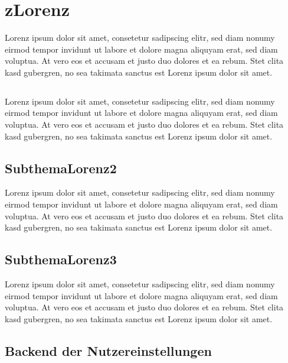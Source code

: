 \section{zLorenz}\label{subsec:zLorenz}

Lorenz ipsum dolor sit amet, consetetur sadipscing elitr, sed diam nonumy eirmod tempor invidunt ut labore et dolore magna aliquyam erat, sed diam voluptua.
At vero eos et accusam et justo duo dolores et ea rebum.
Stet clita kasd gubergren, no sea takimata sanctus est Lorenz ipsum dolor sit amet.

\subsection{}\label{subsubsec:lorenz1}

Lorenz ipsum dolor sit amet, consetetur sadipscing elitr, sed diam nonumy eirmod tempor invidunt ut labore et dolore magna aliquyam erat, sed diam voluptua.
At vero eos et accusam et justo duo dolores et ea rebum.
Stet clita kasd gubergren, no sea takimata sanctus est Lorenz ipsum dolor sit amet.

\subsection{SubthemaLorenz2}\label{subsubsec:lorenz2}

Lorenz ipsum dolor sit amet, consetetur sadipscing elitr, sed diam nonumy eirmod tempor invidunt ut labore et dolore magna aliquyam erat, sed diam voluptua.
At vero eos et accusam et justo duo dolores et ea rebum.
Stet clita kasd gubergren, no sea takimata sanctus est Lorenz ipsum dolor sit amet.

\subsection{SubthemaLorenz3}\label{subsubsec:lorenz3}

Lorenz ipsum dolor sit amet, consetetur sadipscing elitr, sed diam nonumy eirmod tempor invidunt ut labore et dolore magna aliquyam erat, sed diam voluptua.
At vero eos et accusam et justo duo dolores et ea rebum.
Stet clita kasd gubergren, no sea takimata sanctus est Lorenz ipsum dolor sit amet.


\subsection{Backend der Nutzereinstellungen}\label{subsec:backend-user-settings}

